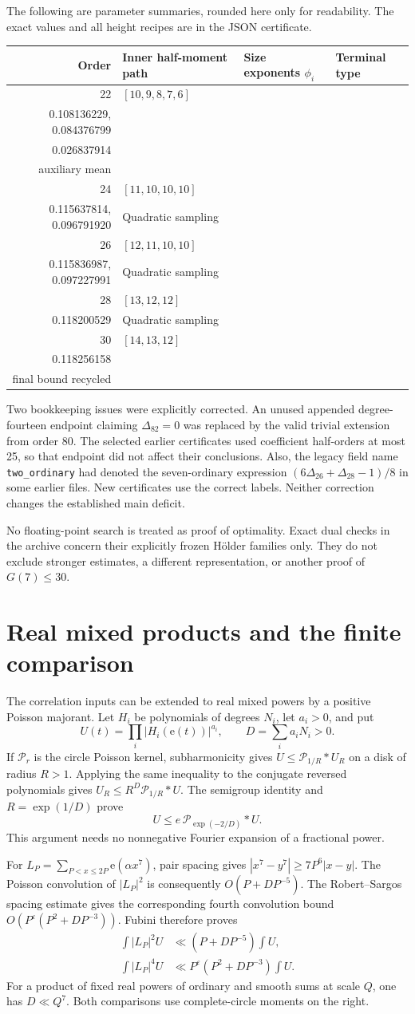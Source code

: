 \documentclass[11pt,letterpaper]{article}
\theoremstyle{remark}
\newcommand{\eps}{\varepsilon}
\newcommand{\e}{\mathrm e}
\newcommand{\ParameterRows}{22 & $[10,9,8,7,6]$ & \shortstack[l]{0.127866478, 0.120048112 \\ 0.108136229, 0.084376799 \\ 0.026837914} & \shortstack[l]{Quadratic sampling;\\ auxiliary mean} \\
24 & $[11,10,10,10]$ & \shortstack[l]{0.130838206, 0.124245584 \\ 0.115637814, 0.096791920} & Quadratic sampling \\
26 & $[12,11,10,10]$ & \shortstack[l]{0.132885530, 0.126603736 \\ 0.115836987, 0.097227991} & Quadratic sampling \\
28 & $[13,12,12]$ & \shortstack[l]{0.134436321, 0.128133606 \\ 0.118200529} & Quadratic sampling \\
30 & $[14,13,12]$ & \shortstack[l]{0.135787759, 0.129473310 \\ 0.118256158} & \shortstack[l]{Available policy;\\ final bound recycled} \\}
\begin{document}
The following are parameter summaries, rounded here only for readability. The exact
values and all height recipes are in the JSON certificate.
\begin{center}\small
\begin{tabular}{r l l l}
\toprule
Order & Inner half-moment path & Size exponents $\phi_i$ & Terminal type\\
\midrule
\ParameterRows
\bottomrule
\end{tabular}
\end{center}

Two bookkeeping issues were explicitly corrected. An unused appended
degree-fourteen endpoint claiming $\Delta_{82}=0$ was replaced by the valid trivial
extension from order 80. The selected earlier certificates used coefficient half-orders
at most 25, so that endpoint did not affect their conclusions. Also, the legacy field
name \texttt{two\_ordinary} had denoted the seven-ordinary expression
$(6\Delta_{26}+\Delta_{28}-1)/8$ in some earlier files. New certificates use the
correct labels. Neither correction changes the established main deficit.

No floating-point search is treated as proof of optimality. Exact dual checks in the
archive concern their explicitly frozen H\"older families only. They do not exclude
stronger estimates, a different representation, or another proof of $G(7)\le30$.

\section{Real mixed products and the finite comparison}
\label{sec:poisson}

The correlation inputs can be extended to real mixed powers by a positive
Poisson majorant. Let $H_i$ be polynomials of degrees $N_i$, let $a_i>0$, and put
\[
 U(t)=\prod_i|H_i(\e(t))|^{a_i},\qquad D=\sum_i a_iN_i>0.
\]
If $\mathcal P_r$ is the circle Poisson kernel, subharmonicity gives
$U\le\mathcal P_{1/R}*U_R$ on a disk of radius $R>1$.
Applying the same inequality to the conjugate reversed polynomials gives
$U_R\le R^D\mathcal P_{1/R}*U$. The semigroup identity and $R=\exp(1/D)$ prove
\[
                 U\le e\,\mathcal P_{\exp(-2/D)}*U.
\]
This argument needs no nonnegative Fourier expansion of a fractional power.

For $L_P=\sum_{P<x\le2P}\e(\alpha x^7)$, pair spacing gives
$|x^7-y^7|\ge7P^6|x-y|$. The Poisson convolution of $|L_P|^2$ is consequently
$O(P+DP^{-5})$. The Robert--Sargos spacing estimate gives the corresponding
fourth convolution bound $O(P^\eps(P^2+DP^{-3}))$. Fubini therefore proves
\begin{align*}
 \int|L_P|^2U&\ll(P+DP^{-5})\int U,\\
 \int|L_P|^4U&\ll P^\eps(P^2+DP^{-3})\int U.
\end{align*}
For a product of fixed real powers of ordinary and smooth sums at scale $Q$,
one has $D\ll Q^7$. Both comparisons use complete-circle moments on the right.
\end{document}
